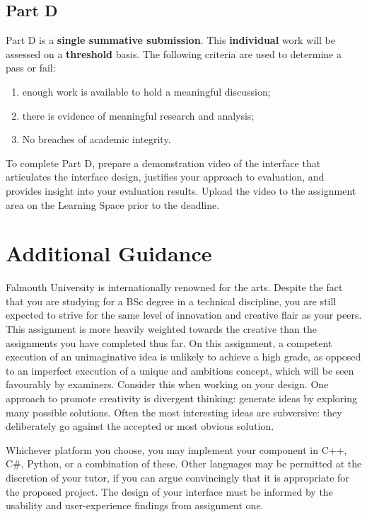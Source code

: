 \documentclass{../../fal_assignment}
\begin{document}
\subsection*{Part D}

Part D is a \textbf{single summative submission}. This \textbf{individual} work will be assessed on a \textbf{threshold} basis. The following criteria are used to determine a pass or fail: 

\begin{enumerate}[label=(\alph*)]
	\item enough work is available to hold a meaningful discussion; 
	\item there is evidence of meaningful research and analysis;
	\item No breaches of academic integrity. 
\end{enumerate}

To complete Part D, prepare a demonstration video of the interface that articulates the interface design, justifies your approach to evaluation, and provides insight into your evaluation results. Upload the video to the assignment area on the Learning Space prior to the deadline. 


\section*{Additional Guidance}
Falmouth University is internationally renowned for the arts. Despite the fact that you are studying for a BSc degree in a technical discipline, you are still expected to strive for the same level of innovation and creative flair as your peers. This assignment is more heavily weighted towards the creative than the assignments you have completed thus far. On this assignment, a competent execution of an unimaginative idea is unlikely to achieve a high grade, as opposed to an imperfect execution of a unique and ambitious concept, which will be seen favourably by examiners. Consider this when working on your design. One approach to promote creativity is divergent thinking: generate ideas by exploring many possible solutions. Often the most interesting ideas are subversive: they deliberately go against the accepted or most obvious solution.

Whichever platform you choose, you may implement your component in C++, C\#, Python, or a combination of these. Other languages may be permitted at the discretion of your tutor, if you can argue convincingly that it is appropriate for the proposed project. The design of your interface must be informed by the usability and user-experience findings from assignment one. 
\end{document}
